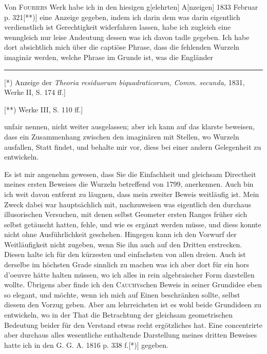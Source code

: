 Von \textsc{Fouriers} Werk habe ich in den hiesigen g[elehrten] A[nzeigen] 1833 Februar p. 321[**)]
eine Anzeige gegeben, indem ich darin dem was darin eigentlich verdienstlich ist Gerechtigkeit
widerfahren lassen, habe ich zugleich eine wenngleich nur leise Andeutung dessen was ich davon
tadle gegeben. Ich habe dort absichtlich mich über die captiöse Phrase, dass die fehlenden
Wurzeln imaginär werden, welche Phrase im Grunde ist, was die Engländer
\par\smallskip\noindent\rule{.25\linewidth}{.4pt}\par\smallskip
\begingroup\small
\noindent\hspace*{\parindent}[*) Anzeige der \textit{Theoria residuorum biquadraticorum,
Comm. secunda,} 1831, Werke II, S. 174 ff.]\par
\noindent\hspace*{\parindent}[**) Werke III, S. 110 ff.]\par
\endgroup
\clearpage
{}
\noindent unfair nennen, nicht weiter ausgelassen; aber ich kann auf das klarste beweisen,
dass ein Zusammenhang zwischen den  imaginären \linebreak
mit  Stellen, wo Wurzeln ausfallen,  Statt findet,
und behalte mir vor, diess bei einer andern Gelegenheit zu entwickeln.

Es ist mir angenehm gewesen, dass Sie die Einfachheit und gleichsam Directheit meines ersten
Beweises die Wurzeln betreffend von 1799, anerkennen. Auch bin ich weit davon entfernt zu läugnen,
dass mein zweiter Beweis weitläufig ist. Mein Zweck dabei war hauptsächlich mit, nachzuweisen
was eigentlich den durchaus illusorischen Versuchen, mit denen selbst Geometer ersten Ranges
früher sich selbst getäuscht hatten, fehle, und wie es ergänzt werden müsse, und diess konnte
nicht ohne Ausführlichkeit geschehen. Hingegen kann ich den Vorwurf der Weitläufigkeit nicht
zugeben, wenn Sie ihn auch auf den Dritten erstrecken. Diesen halte ich für den kürzesten und
einfachsten von allen dreien. Auch ist derselbe im höchsten Grade sinnlich zu machen was ich
aber dort für ein hors d’oeuvre hätte halten müssen, wo ich alles in rein algebraischer Form
darstellen wollte. Übrigens aber finde ich den \textsc{Cauchy}schen Beweis in seiner Grundidee
eben so elegant, und möchte, wenn ich mich auf Einen beschränken sollte, selbst diesem den
Vorzug geben. Aber am lehrreichsten ist es wohl beide Grundideen zu entwickeln, wo in der That
die Betrachtung der gleichsam geometrischen Bedeutung beider für den Verstand etwas recht
ergötzliches hat. Eine concentrirte aber durchaus alles wesentliche enthaltende Darstellung
meines dritten Beweises hatte ich in den G. G. A. 1816 p. 338 f.[*)] gegeben.

